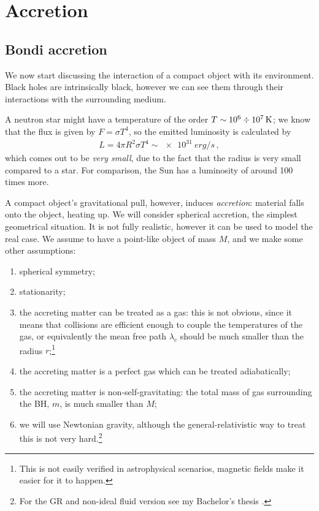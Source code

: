 \documentclass[main.tex]{subfiles}
\begin{document}
\chapter{Accretion}

\section{Bondi accretion}


We now start discussing the interaction of a compact object with its environment.
Black holes are intrinsically black, however we can see them through their interactions with the surrounding medium.

A neutron star might have a temperature of the order \(T \sim \num{e6} \divisionsymbol\SI{e7}{K}\); we know that the flux is given by \(F = \sigma T^{4}\), so the emitted luminosity is calculated by 
%
\begin{align}
L = 4 \pi R^2 \sigma T^{4} \sim \SI{e31}{erg /s}
\,,
\end{align}
%
which comes out to be \emph{very small}, due to the fact that the radius is very small compared to a star. 
For comparison, the Sun has a luminosity of around 100 times more. 

A compact object's gravitational pull, however, induces \emph{accretion}: material falls onto the object, heating up.
We will consider spherical accretion, the simplest geometrical situation.
It is not fully realistic, however it can be used to model the real case. 
We assume to have a point-like object of mass \(M\), and we make some other assumptions: 
\begin{enumerate}
    \item spherical symmetry;
    \item stationarity;
    \item the accreting matter can be treated as a gas: this is not obvious, since it means that collisions are efficient enough to couple the temperatures of the gas, or equivalently the mean free path \(\lambda _c\) should be much smaller than the radius \(r\);\footnote{This is not easily verified in astrophysical scenarios, magnetic fields make it easier for it to happen.}
    \item the accreting matter is a perfect gas which can be treated adiabatically;
    \item the accreting matter is non-self-gravitating: the total mass of gas surrounding the BH, \(m\), is much smaller than \(M\);
    \item we will use Newtonian gravity, although the general-relativistic way to treat this is not very hard.\footnote{For the GR and non-ideal fluid version see my Bachelor's thesis \cite[]{tissinoRelativisticNonidealFlows2019}.}
\end{enumerate}
\end{document}
